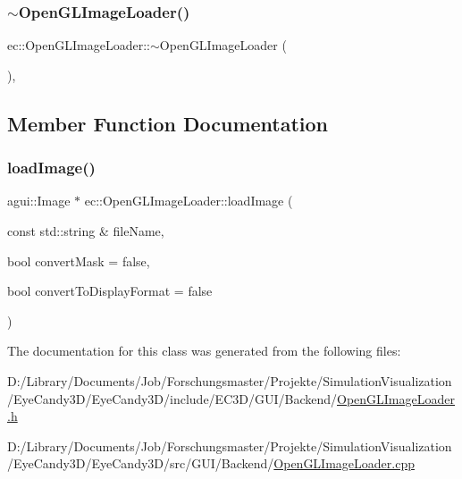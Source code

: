 \subsubsection{\texorpdfstring{$\sim$\+Open\+G\+L\+Image\+Loader()}{~OpenGLImageLoader()}}
{\footnotesize\ttfamily ec\+::\+Open\+G\+L\+Image\+Loader\+::$\sim$\+Open\+G\+L\+Image\+Loader (\begin{DoxyParamCaption}{ }\end{DoxyParamCaption})\hspace{0.3cm}{\ttfamily [virtual]}, {\ttfamily [default]}}



\subsection{Member Function Documentation}
\mbox{\label{classec_1_1_open_g_l_image_loader_a0e552f6d59a9fe5fd9208d7c664e67b7}} 
\subsubsection{\texorpdfstring{load\+Image()}{loadImage()}}
{\footnotesize\ttfamily agui\+::\+Image $\ast$ ec\+::\+Open\+G\+L\+Image\+Loader\+::load\+Image (\begin{DoxyParamCaption}\item[{const std\+::string \&}]{file\+Name,  }\item[{bool}]{convert\+Mask = {\ttfamily false},  }\item[{bool}]{convert\+To\+Display\+Format = {\ttfamily false} }\end{DoxyParamCaption})\hspace{0.3cm}{\ttfamily [override]}}



The documentation for this class was generated from the following files\+:\begin{DoxyCompactItemize}
\item 
D\+:/\+Library/\+Documents/\+Job/\+Forschungsmaster/\+Projekte/\+Simulation\+Visualization/\+Eye\+Candy3\+D/\+Eye\+Candy3\+D/include/\+E\+C3\+D/\+G\+U\+I/\+Backend/\mbox{\hyperlink{_open_g_l_image_loader_8h}{Open\+G\+L\+Image\+Loader.\+h}}\item 
D\+:/\+Library/\+Documents/\+Job/\+Forschungsmaster/\+Projekte/\+Simulation\+Visualization/\+Eye\+Candy3\+D/\+Eye\+Candy3\+D/src/\+G\+U\+I/\+Backend/\mbox{\hyperlink{_open_g_l_image_loader_8cpp}{Open\+G\+L\+Image\+Loader.\+cpp}}\end{DoxyCompactItemize}
